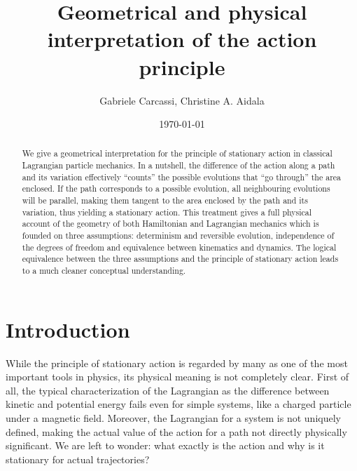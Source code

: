 \documentclass[10pt,twocolumn, nofootinbib]{revtex4-2}
\begin{document}
\title{Geometrical and physical interpretation of the action principle}
\author{Gabriele Carcassi, Christine A. Aidala}

\date{\today}


\begin{abstract}
We give a geometrical interpretation for the principle of stationary action in classical Lagrangian particle mechanics. In a nutshell, the difference of the action along a path and its variation effectively ``counts'' the possible evolutions that ``go through'' the area enclosed. If the path corresponds to a possible evolution, all neighbouring evolutions will be parallel, making them tangent to the area enclosed by the path and its variation, thus yielding a stationary action. This treatment gives a full physical account of the geometry of both Hamiltonian and Lagrangian mechanics which is founded on three assumptions: determinism and reversible evolution, independence of the degrees of freedom and equivalence between kinematics and dynamics. The logical equivalence between the three assumptions and the principle of stationary action leads to a much cleaner conceptual understanding.
\end{abstract}

\maketitle

\section{Introduction}

While the principle of stationary action is regarded by many as one of the most important tools in physics, its physical meaning is not completely clear. First of all, the typical characterization of the Lagrangian as the difference between kinetic and potential energy fails even for simple systems, like a charged particle under a magnetic field. Moreover, the Lagrangian for a system is not uniquely defined, making the actual value of the action for a path not directly physically significant.  We are left to wonder: what exactly is the action and why is it stationary for actual trajectories?
\end{document}
